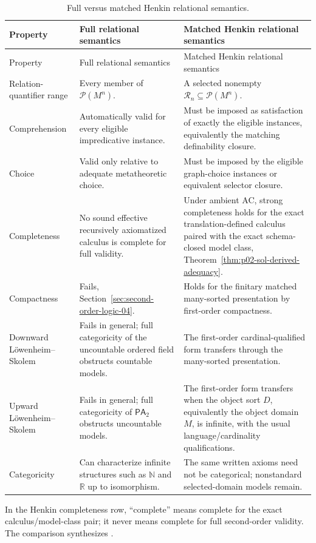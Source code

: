 \begin{landscape}
\begingroup\scriptsize\setlength{\tabcolsep}{4pt}
\begin{longtable}{@{}p{1.35in}p{2.95in}p{2.95in}@{}}
\caption{Full versus matched Henkin relational semantics.}
\label{tab:p02-full-vs-henkin-sol}\\
\toprule
Property & Full relational semantics & Matched Henkin relational semantics \\ \midrule
\endfirsthead
\toprule
Property & Full relational semantics & Matched Henkin relational semantics \\ \midrule
\endhead
Relation-quantifier range & Every member of \(\mathcal P(M^n)\). & A selected nonempty \(\mathcal R_n\subseteq\mathcal P(M^n)\). \\
\addlinespace
Comprehension & Automatically valid for every eligible impredicative instance. & Must be imposed as satisfaction of exactly the eligible instances, equivalently the matching definability closure. \\
\addlinespace
Choice & Valid only relative to adequate metatheoretic choice. & Must be imposed by the eligible graph-choice instances or equivalent selector closure. \\
\addlinespace
Completeness & No sound effective recursively axiomatized calculus is complete for full validity. & Under ambient AC, strong completeness holds for the exact translation-defined calculus paired with the exact schema-closed model class, Theorem~\ref{thm:p02-sol-derived-adequacy}. \\
\addlinespace
Compactness & Fails, Section~\ref{sec:second-order-logic-04}. & Holds for the finitary matched many-sorted presentation by first-order compactness. \\
\addlinespace
Downward L\"owenheim--Skolem & Fails in general; full categoricity of the uncountable ordered field obstructs countable models. & The first-order cardinal-qualified form transfers through the many-sorted presentation. \\
\addlinespace
Upward L\"owenheim--Skolem & Fails in general; full categoricity of \(\mathsf{PA}_2\) obstructs uncountable models. & The first-order form transfers when the object sort \(D\), equivalently the object domain \(M\), is infinite, with the usual language/cardinality qualifications. \\
\addlinespace
Categoricity & Can characterize infinite structures such as \(\mathbb N\) and \(\mathbb R\) up to isomorphism. & The same written axioms need not be categorical; nonstandard selected-domain models remain. \\
\bottomrule
\end{longtable}
\endgroup
\end{landscape}

In the Henkin completeness row, ``complete'' means complete for the exact
calculus/model-class pair; it never means complete for full second-order
validity.  The comparison synthesizes
\cite{Henkin1950,Manzano1996,Shapiro1991}.

